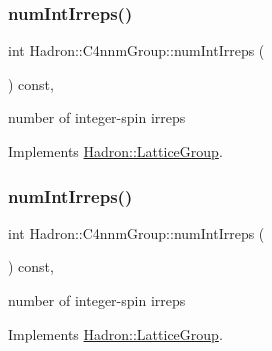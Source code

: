 \mbox{\label{structHadron_1_1C4nnmGroup_afc1f011462142b5aa3ddab6e5824d365}} 
\subsubsection{\texorpdfstring{numIntIrreps()}{numIntIrreps()}\hspace{0.1cm}{\footnotesize\ttfamily [2/3]}}
{\footnotesize\ttfamily int Hadron\+::\+C4nnm\+Group\+::num\+Int\+Irreps (\begin{DoxyParamCaption}{ }\end{DoxyParamCaption}) const\hspace{0.3cm}{\ttfamily [inline]}, {\ttfamily [virtual]}}

number of integer-\/spin irreps 

Implements \mbox{\hyperlink{structHadron_1_1LatticeGroup_af2aa7b39222bf188389356eefcef7547}{Hadron\+::\+Lattice\+Group}}.

\mbox{\label{structHadron_1_1C4nnmGroup_afc1f011462142b5aa3ddab6e5824d365}} 
\subsubsection{\texorpdfstring{numIntIrreps()}{numIntIrreps()}\hspace{0.1cm}{\footnotesize\ttfamily [3/3]}}
{\footnotesize\ttfamily int Hadron\+::\+C4nnm\+Group\+::num\+Int\+Irreps (\begin{DoxyParamCaption}{ }\end{DoxyParamCaption}) const\hspace{0.3cm}{\ttfamily [inline]}, {\ttfamily [virtual]}}

number of integer-\/spin irreps 

Implements \mbox{\hyperlink{structHadron_1_1LatticeGroup_af2aa7b39222bf188389356eefcef7547}{Hadron\+::\+Lattice\+Group}}.

\mbox{\label{structHadron_1_1C4nnmGroup_a70b7d429c62a7f1b2ed77cbc3566ea42}} 
